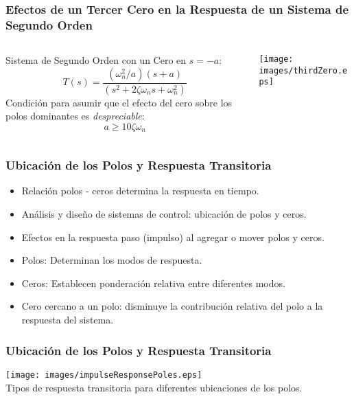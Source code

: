 \documentclass[aspectratio=169,handout]{beamer}
\theoremstyle{definition}
\theoremstyle{plain}
\theoremstyle{remark}
\begin{document}
\begin{frame}[<+->]\frametitle{Efectos de un Tercer Cero en la Respuesta de un Sistema de Segundo Orden}
\vspace*{5mm}
\begin{columns}
\begin{column}{0.5\textwidth}
Sistema de Segundo Orden con un Cero en $s=-a$: 
\begin{equation*}
	T(s) = \frac{(\omega_n^2/a)(s+a)}{(s^2+2 \zeta \omega_n s + \omega_n^2)}
\end{equation*}
Condición para asumir que el efecto del cero sobre los polos dominantes es \textit{despreciable}:
\begin{equation*}
	a \geq 10 \zeta \omega_n
\end{equation*}
\end{column}	
\begin{column}{0.5\textwidth}
\centering
\texttt{[image: images/thirdZero.eps]}
\end{column}	
\end{columns}
\end{frame}

\begin{frame}[<+->]\frametitle{Ubicación de los Polos y Respuesta Transitoria}
\begin{itemize}
	\item Relación polos - ceros determina la respuesta en tiempo.
	\item Análisis y diseño de sistemas de control: ubicación de polos y ceros.
	\item Efectos en la respuesta paso (impulso) al agregar o mover polos y ceros.
	\item Polos: Determinan los modos de respuesta.
	\item Ceros: Establecen ponderación relativa entre diferentes modos.
	\item Cero cercano a un polo: disminuye la contribución relativa del polo a la respuesta del sistema.
\end{itemize}
\end{frame}

\begin{frame}[c]\frametitle{Ubicación de los Polos y Respuesta Transitoria}
\centering
\texttt{[image: images/impulseResponsePoles.eps]}\\
Tipos de respuesta transitoria para diferentes ubicaciones de los polos.
\end{frame}
\end{document}
